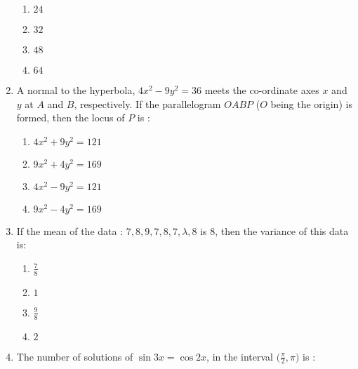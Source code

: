 \documentclass[journal,12pt,twocolumn]{IEEEtran}
\begin{document}
\begin{enumerate}[1.]
\begin{enumerate}[(1)]
 
\item $
24
$

\item $
32
$

\item $
48
$

\item $
64
$


\end{enumerate}
 
\item A normal to the hyperbola, $4x^2-9y^2=36$ meets the co-ordinate axes $x$ and $y$ at $A$ and $B$, respectively. If the parallelogram $OABP$ ($O$ being the origin) is formed, then the locus of $P$ is :


\begin{enumerate}[(1)]
 
\item $
4x^2+9y^2=121
$

\item $
9x^2+4y^2=169
$

\item $
4x^2-9y^2=121
$

\item $
9x^2-4y^2=169
$


\end{enumerate}



\item If the mean of the data : $7,8,9,7,8,7,\lambda,8$ is $8$, then the variance of this data is:


\begin{enumerate}[(1)]
 
\item $
\frac{7}{8}
$

\item $
1
$

\item $
\frac{9}{8}
$

\item $
2
$

\end{enumerate}


\item The number of solutions of $\sin 3x=\cos 2x$, in the interval $ \Big( \frac{\pi}{2},\pi \Big) $ is :


\begin{enumerate}[(1)]
 

\end{enumerate}
\end{enumerate}
\end{document}
